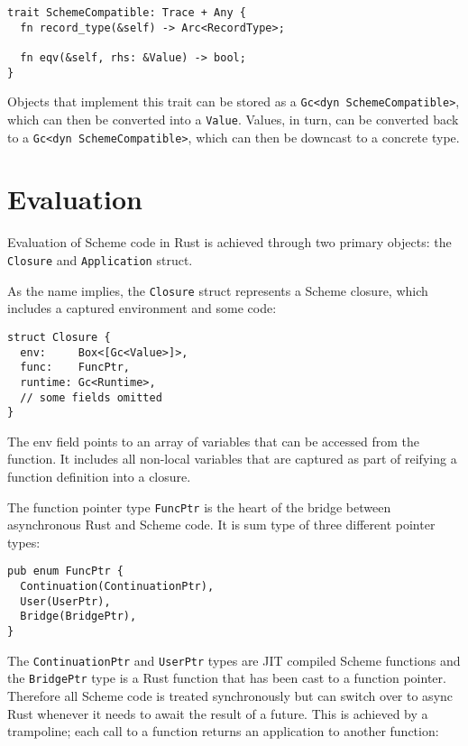 \documentclass[sigplan,review,anonymous]{acmart}
\begin{document}
\begin{verbatim}
trait SchemeCompatible: Trace + Any {
  fn record_type(&self) -> Arc<RecordType>;

  fn eqv(&self, rhs: &Value) -> bool;
}
\end{verbatim}

Objects that implement this trait can be stored as a \texttt{Gc<dyn SchemeCompatible>},
which can then be converted into a \texttt{Value}. Values, in turn, can be converted
back to a \texttt{Gc<dyn SchemeCompatible>}, which can then be downcast to a concrete
type.

\section{Evaluation}

Evaluation of Scheme code in Rust is achieved through two primary objects: the
\texttt{Closure} and \texttt{Application} struct.

As the name implies, the \texttt{Closure} struct represents a Scheme closure,
which includes a captured environment and some code:

\begin{verbatim}
struct Closure {
  env:     Box<[Gc<Value>]>,
  func:    FuncPtr,
  runtime: Gc<Runtime>,
  // some fields omitted
}
\end{verbatim}

The env field points to an array of variables that can be accessed from the
function. It includes all non-local variables that are captured as part of
reifying a function definition into a closure.

The function pointer type \texttt{FuncPtr} is the heart of the bridge between
asynchronous Rust and Scheme code. It is sum type of three different pointer
types:

\begin{verbatim}
pub enum FuncPtr {
  Continuation(ContinuationPtr),
  User(UserPtr),
  Bridge(BridgePtr),
}
\end{verbatim}

The \texttt{ContinuationPtr} and \texttt{UserPtr} types are JIT compiled
Scheme functions and the \texttt{BridgePtr} type is a Rust function that has
been cast to a function pointer. Therefore all Scheme code is treated
synchronously but can switch over to async Rust whenever it needs to await the
result of a future. This is achieved by a trampoline; each call to a function
returns an application to another function:
\end{document}
